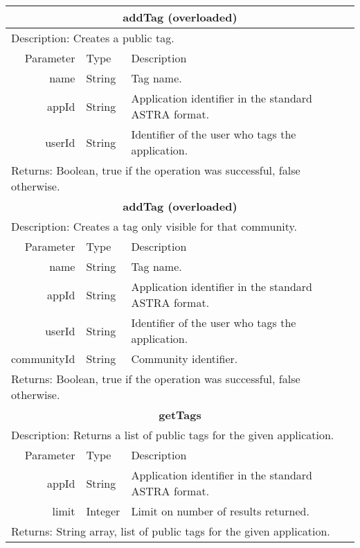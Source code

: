 \begin{table}[h!]
	\small
    \begin{center}
		\begin{tabular}{||r|l|l||}
        
		\hline \hline
		\multicolumn{3}{||c||}{\bfseries{addTag (overloaded)}} \\
		\hline
		\hline 
		\multicolumn{3}{||l||}{Description: Creates a public tag.} \\
		\hline \hline
			Parameter & Type & Description \\
		\hline \hline
			name & String & Tag name. \\
			appId & String & Application identifier in the standard ASTRA format. \\
			userId & String & Identifier of the user who tags the application. \\
		\hline \hline
		\multicolumn{3}{||l||}{Returns: Boolean, true if the operation was successful,
		false otherwise.} \\ \hline \hline
		
		\hline \hline
		\multicolumn{3}{||c||}{\bfseries{addTag (overloaded)}} \\
		\hline
		\hline 
		\multicolumn{3}{||l||}{Description: Creates a tag only visible for that
		community.} \\ \hline \hline
			Parameter & Type & Description \\
		\hline \hline
			name & String & Tag name. \\
			appId & String & Application identifier in the standard ASTRA format. \\
			userId & String & Identifier of the user who tags the application. \\
			communityId & String & Community identifier. \\
		\hline \hline
		\multicolumn{3}{||l||}{Returns: Boolean, true if the operation was successful,
		false otherwise.} \\ \hline \hline


		\hline \hline
		\multicolumn{3}{||c||}{\bfseries{getTags}} \\
		\hline
		\hline 
		\multicolumn{3}{||l||}{Description: Returns a list of public tags for the
		given application.} \\ 
		\hline \hline 
			Parameter & Type & Description \\
		\hline \hline
			appId & String & Application identifier in the standard ASTRA format. \\
			limit & Integer & Limit on number of results returned. \\ \hline \hline
		\multicolumn{3}{||l||}{Returns: String array, list of public tags for the
		given application.} \\
		\hline
		\hline
		

\end{tabular}
\end{center}
\end{table}
